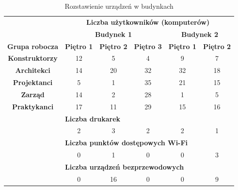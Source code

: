\documentclass[a4paper, 12pt]{article}
\begin{document}
\begin{table}[H]
	\centering
	\begin{tabular}{l|c|c|c|c|c|}
	\cline{2-6}
	\multirow{2}{*}{}                   & \multicolumn{5}{c|}{\textbf{Liczba użytkowników (komputerów)}} \\ \cline{2-6} 
	                                    & \multicolumn{3}{c|}{\textbf{Budynek 1}}  & \multicolumn{2}{c|}{\textbf{Budynek 2}} \\ \hline
	\multicolumn{1}{|c|}{\textbf{Grupa robocza}} & \textbf{Piętro 1}  & \textbf{Piętro 2} & \textbf{Piętro 3} & \textbf{Piętro 1}       & \textbf{Piętro 2}      \\ \hline
	\multicolumn{1}{|c|}{\textbf{Konstruktorzy}} & 12        & 5        & 4        & 9              & 7             \\ \hline
	\multicolumn{1}{|c|}{\textbf{Architekci}}    & 14        & 20       & 32       & 32             & 18            \\ \hline
	\multicolumn{1}{|c|}{\textbf{Projektanci}}   & 5         & 1        & 35       & 21             & 15            \\ \hline
	\multicolumn{1}{|c|}{\textbf{Zarząd}}        & 14        & 2        & 28       & 1              & 5             \\ \hline
	\multicolumn{1}{|c|}{\textbf{Praktykanci}}   & 17        & 11       & 29       & 15             & 16            \\ \hline
	\multirow{6}{*}{}                   & \multicolumn{5}{l|}{\textbf{Liczba drukarek}}                             \\ \cline{2-6} 
	                                    & 2         & 3        & 2        & 2              & 1             \\ \cline{2-6} 
	                                    & \multicolumn{5}{l|}{\textbf{Liczba punktów dostępowych Wi-Fi}}            \\ \cline{2-6} 
	                                    & 0         & 1        & 0        & 0              & 3             \\ \cline{2-6} 
	                                    & \multicolumn{5}{l|}{\textbf{Liczba urządzeń bezprzewodowych}}             \\ \cline{2-6} 
	                                    & 0         & 16       & 0        & 0              & 9             \\ \cline{2-6} 
	\end{tabular}
	\caption{Rozstawienie urządzeń w budynkach}
\end{table}
\end{document}
